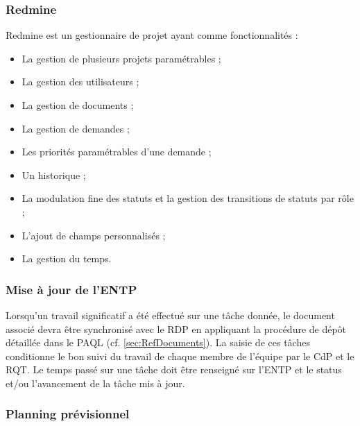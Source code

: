 \documentclass[a4paper,11pt,titlepage]{article}
\begin{document}
\subsubsection{Redmine}
Redmine est un gestionnaire de projet ayant comme fonctionnalités :
\begin{itemize}
    \item La gestion de plusieurs projets paramétrables ;
    \item La gestion des utilisateurs ;
    \item La gestion de documents ;
    \item La gestion de demandes ;
    \item Les priorités paramétrables d'une demande ;
    \item Un historique ;
    \item La modulation fine des statuts et la gestion des transitions de statuts par rôle ;
    \item L'ajout de champs personnalisés ;
    \item La gestion du temps.
\end{itemize}

\subsubsection{Mise à jour de l'ENTP}
Lorsqu'un travail significatif a été effectué sur une tâche donnée, le
document associé devra être synchronisé avec le RDP en appliquant la
procédure de dépôt détaillée dans le PAQL (cf. \ref{sec:RefDocuments}).
La saisie de ces tâches conditionne le bon suivi du travail de chaque membre
de l'équipe par le CdP et le RQT. Le temps passé sur une tâche doit être renseigné
sur l'ENTP et le status et/ou l'avancement de la tâche mis à jour.\\

\newpage
\subsubsection{Planning prévisionnel}
\end{document}

